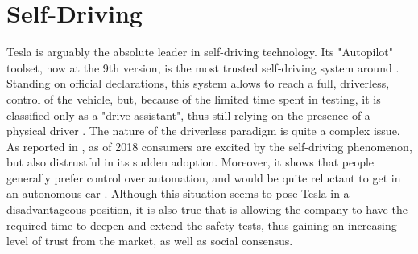 \section{Self-Driving}

Tesla is arguably the absolute leader in self-driving technology. Its "Autopilot" toolset, now at the 9th version, is the most trusted self-driving system around \cite{tesla_autopilot_trust}. Standing on official declarations, this system allows to reach a full, driverless, control of the vehicle, but, because of the limited time spent in testing, it is classified only as a "drive assistant", thus still relying on the presence of a physical driver \cite{tesla_full_selfdriving}.
The nature of the driverless paradigm is quite a complex issue. As reported in \cite{tesla_autopilot_awareness}, as of 2018 consumers are excited by the self-driving phenomenon, but also distrustful in its sudden adoption. Moreover, it shows that people generally prefer control over automation, and would be quite reluctant to get in an autonomous car \cite{tesla_pilot_cheatsheet}. Although this situation seems to pose Tesla in a disadvantageous position, it is also true that is allowing the company to have the required time to deepen and extend the safety tests, thus gaining an increasing level of trust from the market, as well as social consensus.
